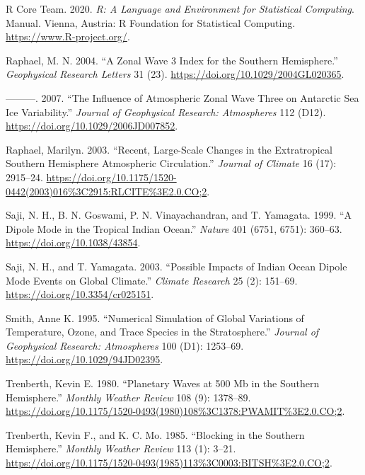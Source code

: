 \documentclass[smallextended]{svjour3}       %
\newlength{\cslhangindent}
\newlength{\cslentryspacingunit} %
\newenvironment{CSLReferences}[2] %
 {%
  \setlength{\parindent}{0pt}
  \ifodd #1
  \let\oldpar\par
  \def\par{\hangindent=\cslhangindent\oldpar}
  \fi
  \setlength{\parskip}{#2\cslentryspacingunit}
 }%
 {}
\begin{document}
\begin{CSLReferences}{1}{0}
\leavevmode{}%
R Core Team. 2020. \emph{R: {A} Language and Environment for Statistical Computing}. Manual. {Vienna, Austria}: {R Foundation for Statistical Computing}. \url{https://www.R-project.org/}.

\leavevmode{}%
Raphael, M. N. 2004. {``A Zonal Wave 3 Index for the {Southern Hemisphere}.''} \emph{Geophysical Research Letters} 31 (23). \url{https://doi.org/10.1029/2004GL020365}.

\leavevmode{}%
---------. 2007. {``The Influence of Atmospheric Zonal Wave Three on {Antarctic} Sea Ice Variability.''} \emph{Journal of Geophysical Research: Atmospheres} 112 (D12). \url{https://doi.org/10.1029/2006JD007852}.

\leavevmode{}%
Raphael, Marilyn. 2003. {``Recent, {Large-Scale Changes} in the {Extratropical Southern Hemisphere Atmospheric Circulation}.''} \emph{Journal of Climate} 16 (17): 2915--24. \url{https://doi.org/10.1175/1520-0442(2003)016\%3C2915:RLCITE\%3E2.0.CO;2}.

\leavevmode{}%
Saji, N. H., B. N. Goswami, P. N. Vinayachandran, and T. Yamagata. 1999. {``A Dipole Mode in the Tropical {Indian Ocean}.''} \emph{Nature} 401 (6751, 6751): 360--63. \url{https://doi.org/10.1038/43854}.

\leavevmode{}%
Saji, N. H., and T. Yamagata. 2003. {``Possible Impacts of {Indian Ocean Dipole} Mode Events on Global Climate.''} \emph{Climate Research} 25 (2): 151--69. \url{https://doi.org/10.3354/cr025151}.

\leavevmode{}%
Smith, Anne K. 1995. {``Numerical Simulation of Global Variations of Temperature, Ozone, and Trace Species in the Stratosphere.''} \emph{Journal of Geophysical Research: Atmospheres} 100 (D1): 1253--69. \url{https://doi.org/10.1029/94JD02395}.

\leavevmode{}%
Trenberth, Kevin E. 1980. {``Planetary {Waves} at 500 Mb in the {Southern Hemisphere}.''} \emph{Monthly Weather Review} 108 (9): 1378--89. \url{https://doi.org/10.1175/1520-0493(1980)108\%3C1378:PWAMIT\%3E2.0.CO;2}.

\leavevmode{}%
Trenberth, Kevin F., and K. C. Mo. 1985. {``Blocking in the {Southern Hemisphere}.''} \emph{Monthly Weather Review} 113 (1): 3--21. \url{https://doi.org/10.1175/1520-0493(1985)113\%3C0003:BITSH\%3E2.0.CO;2}.


\end{CSLReferences}
\end{document}
